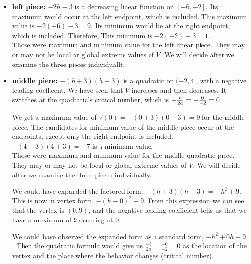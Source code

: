 \documentclass{ximera}
\begin{document}
\begin{itemize}
  \item \textbf{left piece:} \textbf{$-2h-3$} is a decreasing linear function on $[-6, -2]$.  Its maximum would occur at the left endpoint, which is included.  This maximum value is $-2(-6)-3 = 9$. Its minimum would be at the right endpoint, which is included. Therefore, This minimum is $-2(-2)-3 = 1$. \\

  Those were maximum and minimum value for the left linear piece.  They may or may not be local or global extreme values of $V$.  We will decide after we examine the three pieces individuallt. \\


 
  \item \textbf{middle piece:} \textbf{$-(h+3)(h-3)$} is a quadratic on $(-2, 4]$, with a negative leading coefficent.  We have seen that $V$ increases and then decreases.  It switches at the quadratic's critical number, which is $-\frac{b}{2a} = -\frac{0}{-2} = 0 \\$

  We get a maximum value of $V(0) = -(0+3)(0-3) = 9$ for the middle piece.  The candidates for minimum value of the middle piece occur at the endpoints, except only the right endpoint is included.  $-(4-3)(4+3) = -7$ is a minimum value. \\

   Those were maximum and minimum value for the middle quadratic piece.  They may or may not be local or global extreme values of $V$.  We will decide after we examine the three pieces individually. \\














\begin{observation}


We could have expanded the factored form: $-(h+3)(h-3) = -h^2 + 9$.  This is now in vertex form, $-(h-0)^2 + 9$. From this expression we can see that the vertex is $(0, 9)$, and the negative leading coefficient tells us that we have a maximum of $9$ occuring at $0$.


We could have observed the expanded form as a standard form, $-h^2 + 0 h + 9$.  Then the quadratic formula would give us $\frac{-b}{2a} = \frac{-0}{-2} = 0$ as the location of the vertex and the place where the behavior changes (critical number).



\end{observation}
\end{itemize}
\end{document}
